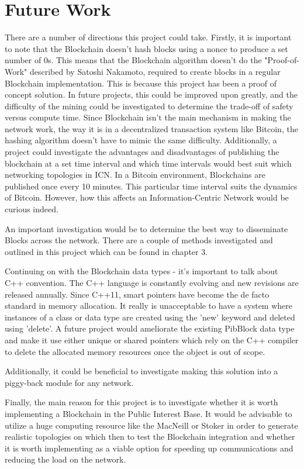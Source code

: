 \section{Future Work}
There are a number of directions this project could take. Firstly, it is important to note that the Blockchain doesn't hash blocks using a nonce to produce a set number of 0s. This means that the Blockchain algorithm doesn't do the "Proof-of-Work" described by Satoshi Nakamoto, required to create blocks in a regular Blockchain implementation. This is because this project has been a proof of concept solution. In future projects, this could be improved upon greatly, and the difficulty of the mining could be investigated to determine the trade-off of safety versus compute time. Since Blockchain isn't the main mechanism in making the network work, the way it is in a decentralized transaction system like Bitcoin, the hashing algorithm doesn't have to mimic the same difficulty. Additionally, a project could investigate the advantages and disadvantages of publishing the blockchain at a set time interval and which time intervals would best suit which networking topologies in ICN. In a Bitcoin environment, Blockchains are published once every 10 minutes. This particular time interval suits the dynamics of Bitcoin. However, how this affects an Information-Centric Network would be curious indeed.\par 
An important investigation would be to determine the best way to disseminate Blocks across the network. There are a couple of methods investigated and outlined in this project which can be found in chapter 3. \par 
Continuing on with the Blockchain data types - it's important to talk about C++ convention. The C++ language is constantly evolving and new revisions are released annually. Since C++11, smart pointers have become the de facto standard in memory allocation. It really is unacceptable to have a system where instances of a class or data type are created using the 'new' keyword and deleted using 'delete'. A future project would ameliorate the existing PibBlock data type and make it use either unique or shared pointers which rely on the C++ compiler to delete the allocated memory resources once the object is out of scope. \par 
Additionally, it could be beneficial to investigate making this solution into a piggy-back module for any network. \par
Finally, the main reason for this project is to investigate whether it is worth implementing a Blockchain in the Public Interest Base. It would be advisable to utilize a huge computing resource like the MacNeill or Stoker in order to generate realistic topologies on which then to test the Blockchain integration and whether it is worth implementing as a viable option for speeding up communications and reducing the load on the network.
